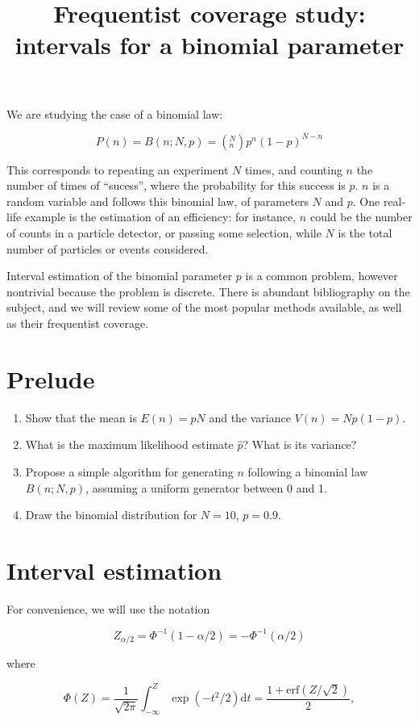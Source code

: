 \documentclass[a4paper,12pt]{article}
\title{Frequentist coverage study: intervals for a binomial parameter}
\author{}
\date{}
\begin{document}
 \maketitle
 
 We are studying the case of a binomial law:
 
 $$P(n) = B(n;N,p) = \left( ^N_n \right) p^n (1-p)^{N-n}$$
 
 This corresponds to repeating an experiment $N$ times, and counting $n$ the number of times of ``sucess'', where the probability for this success is $p$. $n$ is a random variable and follows this binomial law, of parameters $N$ and $p$. One real-life example is the estimation of an efficiency: for instance, $n$ could be the number of counts in a particle detector,
 or passing some selection, while $N$ is the total number of particles or events considered.
 
 Interval estimation of the binomial parameter $p$ is a common problem, however nontrivial because the problem is discrete. There is abundant bibliography on the subject, and we will review
 some of the most popular methods available, as well as their frequentist coverage.
 
 \section{Prelude}
 
 \begin{enumerate}
  \item Show that the mean is $E(n) = pN$ and the variance $V(n) = N p (1-p)$.
  \item What is the maximum likelihood estimate $\hat{p}$? What is its variance?
  \item Propose a simple algorithm for generating $n$ following a binomial law $B(n;N,p)$, assuming a uniform generator between 0 and 1.
  \item Draw the binomial distribution for $N=10$, $p=0.9$.
 \end{enumerate}
 
 \section{Interval estimation}
 
 For convenience, we will use the notation 
 
 $$Z_{\alpha/2} = \Phi^{-1}(1-\alpha/2) = -\Phi^{-1}(\alpha / 2)$$
 
 where
 
 $$\Phi(Z) = \frac{1}{\sqrt{2\pi}} \int_{-\infty}^Z \exp(-t^2 / 2) \text{d} t = \frac{1+\text{erf}(Z/\sqrt{2})}{2},$$
 
\end{document}
